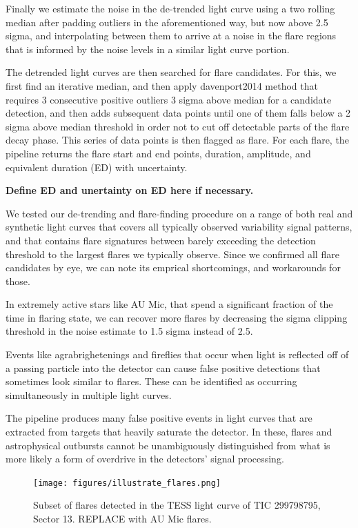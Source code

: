 \documentclass[fleqn,usenatbib,letters]{mnras}%
\begin{document}
Finally we estimate the noise in the de-trended light curve using a two rolling median after padding outliers in the aforementioned way, but now above 2.5 sigma, and interpolating between them to arrive at a noise in the flare regions that is informed by the noise levels in a similar light curve portion.

The detrended light curves are then searched for flare candidates. For this, we first find an iterative median, and then apply davenport2014 method that requires 3 consecutive positive outliers 3 sigma above median for a candidate detection, and then adds subsequent data points until one of them falls below a 2 sigma above median threshold in order not to cut off detectable parts of the flare decay phase. This series of data points is then flagged as flare. For each flare, the pipeline returns the flare start and end points, duration, amplitude, and equivalent duration (ED) with uncertainty.

\textbf{Define ED and unertainty on ED here if necessary.} 

We tested our de-trending and flare-finding procedure on a range of both real and synthetic light curves that covers all typically observed variability signal patterns, and that contains flare signatures between barely exceeding the detection threshold to the largest flares we typically observe. Since we confirmed all flare candidates by eye, we can note its emprical shortcomings, and workarounds for those. 

In extremely active stars like AU Mic, that spend a significant fraction of the time in flaring state, we can recover more flares by decreasing the sigma clipping threshold in the noise estimate to 1.5 sigma instead of 2.5. 

Events like agrabrighetenings and fireflies that occur when light is reflected off of a passing particle into the detector can cause false positive detections that sometimes look similar to flares. These can be identified as occurring simultaneously in multiple light curves.

The pipeline produces many false positive events in light curves that are extracted from targets that heavily saturate the detector. In these, flares and astrophysical outbursts cannot be unambiguously distinguished from what is more likely a form of overdrive in the detectors' signal processing. 
\begin{figure}
\texttt{[image: figures/illustrate\_flares.png]} 
\caption{Subset of flares detected in the TESS light curve of TIC 299798795, Sector 13.  REPLACE with AU Mic flares.}
\label{fig:illustrate_detrend}
\end{figure}
\end{document}
